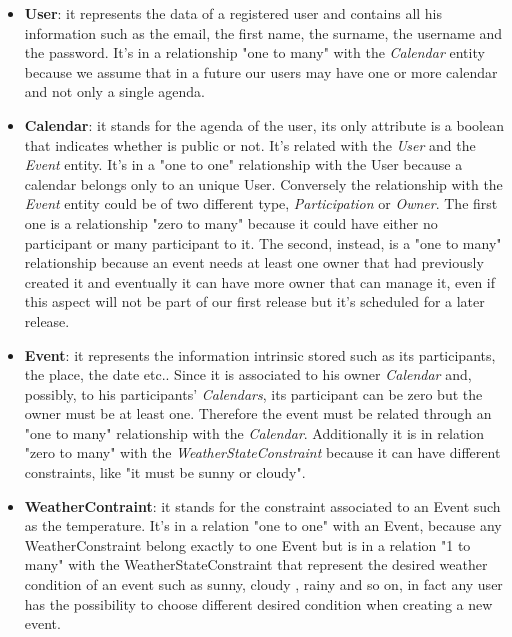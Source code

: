 \begin{itemize}
\item{\bf User}: it represents the data of a registered user and contains all his information such as the email, the first name, the surname, the username and the password. It's in a relationship "one to many" with the \textit{Calendar} entity because we assume that in a future our users may have one or more calendar and not only a single agenda.
\item{\bf Calendar}: it stands for the agenda of the user, its only attribute is a boolean that indicates whether is public or not. It's related with the \textit{User} and the \textit{Event} entity. It's in a "one to one" relationship with the User because a calendar belongs only to an unique User. Conversely the relationship with the \textit{Event} entity could be of two different type, \textit{Participation} or \textit{Owner}. The first one is a relationship "zero to many" because it could have either no participant or many participant to it. The second, instead, is a "one to many" relationship because an event needs at least one owner that had previously created it and eventually it can have more owner that can manage it, even if this aspect will not be part of our first release but it's scheduled for a later release.
\item{\bf Event}: it represents the information intrinsic stored such as its participants, the place, the date etc.. Since it is associated to his owner \textit{Calendar} and, possibly, to his participants' \textit{Calendars}, its participant can be zero but the owner must be at least one. Therefore the event must be related through an "one to many" relationship with the \textit{Calendar}. Additionally it is in relation "zero to many" with the \textit{WeatherStateConstraint} because it can have different constraints, like "it must be sunny or cloudy".
\item{\bf WeatherContraint}: it stands for the constraint associated to an Event such as the temperature. It's in a relation "one to one" with an Event, because any WeatherConstraint belong exactly to one Event but is in a relation "1 to many" with the WeatherStateConstraint that represent the desired weather condition of an event such as sunny, cloudy , rainy and so on, in fact any user has the possibility to choose different desired condition when creating a new event.
\end{itemize}
